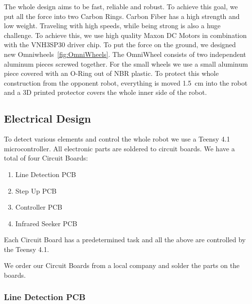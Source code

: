 \documentclass{scrartcl}
\begin{document}
The whole design aims to be fast, reliable and robust. To achieve this goal, we put all the force
into two Carbon Rings. Carbon Fiber has a high strength and low weight.
\newline
Traveling with high speeds, while being strong is also a huge challenge. To achieve this, we use high quality
Maxon DC Motors in combination with the VNH3SP30 driver chip. To put the force on the ground, we designed
new Omniwheels~\ref{fig:OmniWheels}.
The OmniWheel consists of two independent aluminum pieces screwed together. For the small wheels we use a small
aluminum piece covered with an O-Ring out of NBR plastic.
\newline
To protect this whole construction from the opponent robot, everything is moved 1.5 cm into the robot and a 3D
printed protector covers the whole inner side of the robot.
\newpage

\subsection{Electrical Design}
To detect various elements and control the whole robot we use a Teensy 4.1 microcontroller. All electronic
parts are soldered to circuit boards.
\newline
We have a total of four Circuit Boards:
\begin{enumerate}
    \item{Line Detection PCB}
    \item{Step Up PCB}
    \item{Controller PCB}
    \item{Infrared Seeker PCB}
\end{enumerate}
Each Circuit Board has a predetermined task and all the above are controlled by the Teensy 4.1.

We order our Circuit Boards from a local company and solder the parts on the boards.

\subsubsection{Line Detection PCB}
\end{document}
